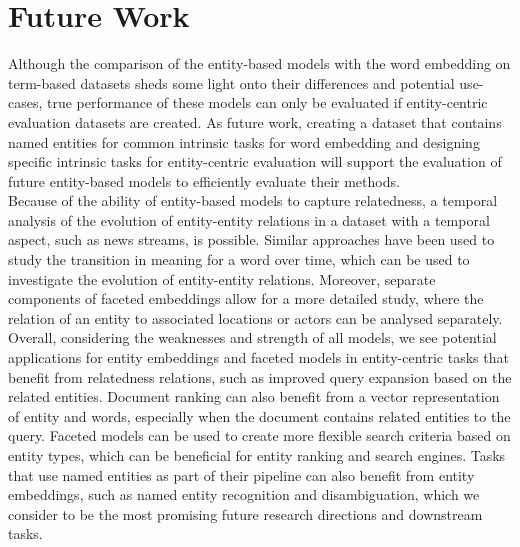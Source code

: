 \section{Future Work}
Although the comparison of the entity-based models with the word embedding on term-based datasets sheds some light onto their differences and potential use-cases, true performance of these models can only be evaluated if entity-centric evaluation datasets are created.
As future work, creating a dataset that contains named entities for common intrinsic tasks for word embedding and designing specific intrinsic tasks for entity-centric evaluation will support the evaluation of future entity-based models to efficiently evaluate their methods.\\
Because of the ability of entity-based models to capture relatedness, a temporal analysis of the evolution of entity-entity relations in a dataset with a temporal aspect, such as news streams, is possible. Similar approaches have been used to study the transition in meaning for a word over time, which can be used to investigate the evolution of entity-entity relations. Moreover, separate components of faceted embeddings allow for a more detailed study, where the relation of an entity to associated locations or actors can be analysed separately. \\
Overall, considering the weaknesses and strength of all models, we see potential applications for entity embeddings and faceted models in entity-centric tasks that benefit from relatedness relations, such as improved query expansion based on the related entities. Document ranking can also benefit from a vector representation of entity and words, especially when the document contains related entities to the query. Faceted models can be used to create more flexible search criteria based on entity types, which can be beneficial for entity ranking and search engines. Tasks that use named entities as part of their pipeline can also benefit from entity embeddings, such as named entity recognition and disambiguation, which we consider to be the most promising future research directions and downstream tasks.\\
